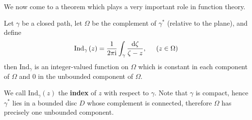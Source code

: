 \begin{example}
\begin{center}
\end{center}
\end{example}
We now come to a theorem which plays a very important role in function theory.
\begin{theorem}
Let $\gamma$ be a closed path, let $\Omega$ be the complement of $\gamma^*$ (relative to the plane), and define 
$$
\mathrm{Ind}_{\gamma}\left( z \right) =\frac{1}{2\pi \mathrm{i}}\int_{\gamma}{\frac{\mathrm{d}\zeta}{\zeta -z}},\hspace{0.5cm}\left( z\in \Omega \right) 
$$
then $\mathrm{Ind}_\gamma$ is an integer-valued function on $\Omega$ which is constant in each component of $\Omega$ and $0$ in the unbounded component of $\Omega$.
\end{theorem}
We call $\mathrm{Ind}_\gamma(z)$ the \textbf{index} of $z$ with respect to $\gamma$. Note that $\gamma$ is compact, hence $\gamma^*$ lies in a bounded disc $D$ whose complement is connected, therefore $\Omega$ has precisely one unbounded component.
